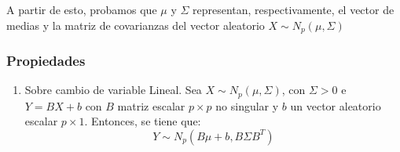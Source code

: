 A partir de esto, probamos que $\mu$ y $\Sigma$ representan, respectivamente, el vector de medias y la matriz de covarianzas del vector aleatorio $X \sim N_p(\mu,\Sigma)$

\subsubsection{Propiedades}
\begin{enumerate}
\item Sobre cambio de variable Lineal. Sea $X \sim N_p(\mu,\Sigma)$, con $\Sigma > 0$ e $Y = BX+b$ con $B$ matriz escalar $p\times p$ no singular y $b$ un vector aleatorio escalar $p\times 1$. Entonces, se tiene que:
  \[
Y \sim N_p(B\mu+b, B \Sigma B^T)
  \]
\end{enumerate}
